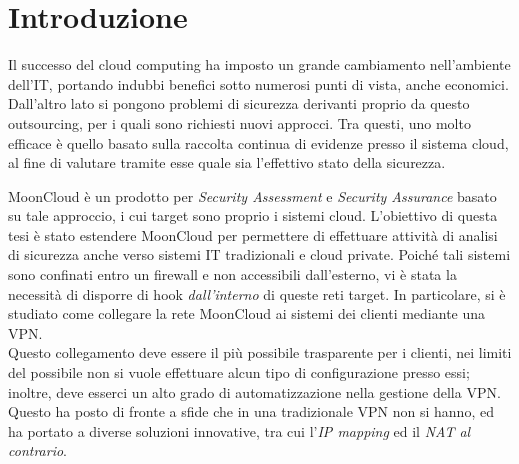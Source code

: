 \chapter*{Introduzione}

Il successo del cloud computing ha imposto un grande cambiamento nell'ambiente dell'IT,
portando indubbi benefici sotto numerosi punti di vista, anche economici. Dall'altro
lato si pongono problemi di sicurezza derivanti proprio da questo outsourcing, per i
quali sono richiesti nuovi approcci. Tra questi, uno molto efficace è quello basato
sulla raccolta continua di evidenze presso il sistema cloud, al fine di valutare
tramite esse quale sia l'effettivo stato della sicurezza.


MoonCloud è un prodotto per \textit{Security Assessment}  e \textit{Security Assurance}
basato su tale approccio, 
i cui target sono proprio i sistemi cloud. L'obiettivo di questa tesi è stato
estendere MoonCloud per permettere di effettuare attività di analisi di sicurezza anche
verso sistemi IT tradizionali e cloud private. Poiché tali sistemi
sono confinati entro un firewall e non accessibili dall'esterno, vi è stata la necessità
di disporre di hook \textit{dall'interno} di queste reti target. In particolare,
si è studiato come collegare la rete MoonCloud ai sistemi dei clienti mediante
una VPN.\\
Questo collegamento deve essere il più possibile trasparente per i clienti, nei limiti
del possibile non si vuole effettuare alcun tipo di configurazione presso essi; inoltre,
deve esserci un alto grado di automatizzazione nella gestione della VPN.
Questo ha posto di fronte a sfide che in una tradizionale VPN non si hanno, ed ha portato
a diverse soluzioni innovative, tra cui l'\textit{IP mapping} ed il \textit{NAT al contrario}.


